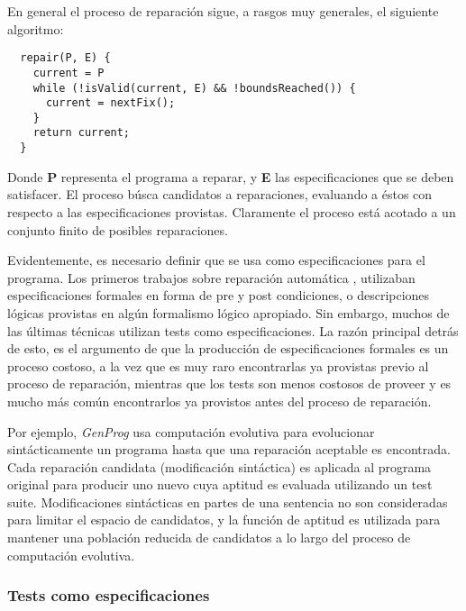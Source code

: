 En general el proceso de reparaci\'on sigue, a rasgos muy generales, el siguiente algoritmo:

\begin{lstlisting}
  repair(P, E) {
    current = P
    while (!isValid(current, E) && !boundsReached()) {
      current = nextFix();
    }
    return current;
  }
\end{lstlisting}

Donde \textbf{P} representa el programa a reparar, y \textbf{E} las especificaciones que se deben satisfacer. El proceso b\'usca candidatos a reparaciones, evaluando a \'estos con respecto a las especificaciones provistas. Claramente el proceso est\'a acotado a un conjunto finito de posibles reparaciones.

Evidentemente, es necesario definir que se usa como especificaciones para el programa. Los primeros trabajos sobre reparaci\'on autom\'atica \cite{bibliography.repair.StaberJB05, bibliography.repair.ArcuriY08}, utilizaban especificaciones formales en forma de pre y post condiciones, o descripciones l\'ogicas provistas en alg\'un formalismo l\'ogico apropiado. Sin embargo, muchos de las \'ultimas t\'ecnicas utilizan tests como especificaciones. La raz\'on principal detr\'as de esto, es el argumento de que la producci\'on de especificaciones formales es un proceso costoso, a la vez que es muy raro encontrarlas ya provistas previo al proceso de reparaci\'on, mientras que los tests son menos costosos de proveer y es mucho m\'as com\'un encontrarlos ya provistos antes del proceso de reparaci\'on.

Por ejemplo, \emph{GenProg} \cite{bibliography.repair.GouesNFW12} usa computaci\'on evolutiva para evolucionar sint\'acticamente un programa hasta que una reparaci\'on aceptable es encontrada. Cada reparaci\'on candidata (modificaci\'on sint\'actica) es aplicada al programa original para producir uno nuevo cuya aptitud es evaluada utilizando un test suite. Modificaciones sint\'acticas en partes de una sentencia no son consideradas para limitar el espacio de candidatos, y la funci\'on de aptitud es utilizada para mantener una poblaci\'on reducida de candidatos a lo largo del proceso de computaci\'on evolutiva. 

\subsubsection{Tests como especificaciones}
\label{sec:repair.specs.testsAsSpecs}


